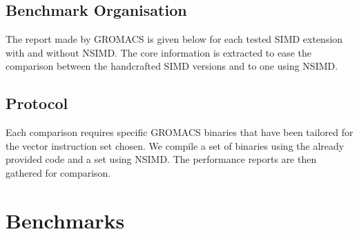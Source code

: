 \documentclass[a4paper,11pt]{article}
\newcommand{\gromacs}{GROMACS}
\newcommand{\nsimd}{NSIMD}
\begin{document}
\subsection{Benchmark Organisation}

The report made by \gromacs{} is given below for each tested SIMD extension with and without \nsimd{}. The core information is extracted to ease the comparison between the handcrafted SIMD versions and to one using \nsimd{}.

\subsection{Protocol}

Each comparison requires specific \gromacs{} binaries that have been tailored for the vector instruction set chosen. We compile a set of binaries using the already provided code and a set using \nsimd{}. The performance reports are then gathered for comparison.



\renewcommand{\subsectionmark}[1]{\markright{#1}}
\fancyhf[HR]{\rightmark}

\section{Benchmarks}
\end{document}
